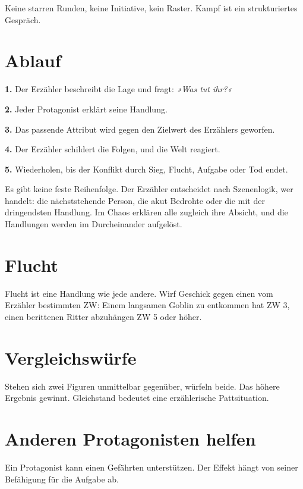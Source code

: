 \documentclass[10pt,a4paper]{article}
\begin{document}
Keine starren Runden, keine Initiative, kein Raster. Kampf ist ein strukturiertes Gespräch.

\section*{Ablauf}
\textbf{1.} Der Erzähler beschreibt die Lage und fragt: \textit{»Was tut ihr?«}

\textbf{2.} Jeder Protagonist erklärt seine Handlung.

\textbf{3.} Das passende Attribut wird gegen den Zielwert des Erzählers geworfen.

\textbf{4.} Der Erzähler schildert die Folgen, und die Welt reagiert.

\textbf{5.} Wiederholen, bis der Konflikt durch Sieg, Flucht, Aufgabe oder Tod endet.

Es gibt keine feste Reihenfolge. Der Erzähler entscheidet nach Szenenlogik, wer handelt: die nächststehende Person, die akut Bedrohte oder die mit der dringendsten Handlung. Im Chaos erklären alle zugleich ihre Absicht, und die Handlungen werden im Durcheinander aufgelöst.

\section*{Flucht}
Flucht ist eine Handlung wie jede andere. Wirf Geschick gegen einen vom Erzähler bestimmten ZW: Einem langsamen Goblin zu entkommen hat ZW 3, einen berittenen Ritter abzuhängen ZW 5 oder höher.

\section*{Vergleichswürfe}
Stehen sich zwei Figuren unmittelbar gegenüber, würfeln beide. Das höhere Ergebnis gewinnt. Gleichstand bedeutet eine erzählerische Pattsituation.

\section*{Anderen Protagonisten helfen}
Ein Protagonist kann einen Gefährten unterstützen. Der Effekt hängt von seiner Befähigung für die Aufgabe ab.
\end{document}
